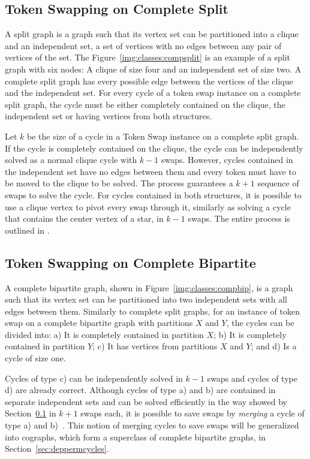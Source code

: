 \documentclass[msc]{ppgccufmg}    %
\begin{document}
\subsection{Token Swapping on Complete Split}
\label{sec:intro:classes_uppers:compsplit}

A split graph is a graph such that its vertex set can be partitioned into
a clique and an independent set, a set of vertices with no edges between any
pair of vertices of the set.
The Figure~\ref{img:classes:compsplit} is an example of a split graph with six
nodes: A clique of size four and an independent set of size two.
A complete split graph has every possible edge between the vertices of the
clique and the independent set.
For every cycle of a token swap instance on a complete split graph, the cycle
must be either completely contained on the clique, the independent set or
having vertices from both structures.

Let $k$ be the size of a cycle in a Token Swap instance  on a complete split
graph.
If the cycle is completely contained on the clique, the cycle can be independently
solved as a normal clique cycle with $k -1$ swaps.
However, cycles contained in the independent set have no edges between them
and every token must have to be moved to the clique to be solved.
The process guarantees a $k + 1$ sequence of swaps to solve the cycle.
For cycles contained in both structures, it is possible to use a clique vertex
to pivot every swap through it, similarly as solving a cycle that contains the
center vertex of a star, in $k - 1$ swaps.
The entire process is outlined in \cite{Yasui:2015}.

\subsection{Token Swapping on Complete Bipartite}

A complete bipartite graph, shown in Figure~\ref{img:classes:compbip}, 
is a graph such that its vertex set can be partitioned into two independent sets
with all edges between them.
Similarly to complete split graphs, for an instance of token swap on a complete
bipartite graph with partitions $X$ and $Y$, the cycles can be divided into: 
a) It is completely contained in partition $X$; b) It is completely contained
in partition $Y$; c) It has vertices from partitions $X$ and $Y$; and d) Is a
cycle of size one.

Cycles of type c) can be independently solved in $k - 1$ swaps and cycles of
type d) are already correct.
Although cycles of type a) and b) are contained in separate independent sets
and can be solved efficiently in the way showed by Section~\ref{sec:intro:classes_uppers:compsplit} 
in $k + 1$ swaps each, it is possible to save swaps by \textit{merging} a cycle
of type a) and b)~\citep{Yamanaka:2015}.
This notion of merging cycles to save swaps will be generalized into cographs,
which form a superclass of complete bipartite graphs, in Section~\ref{sec:deppermcycles}.
\end{document}
